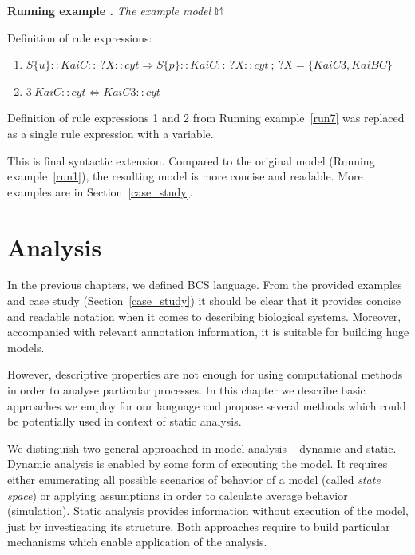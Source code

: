 \documentclass[12pt]{fithesis2}
\newcounter{counter}[section]
\renewcommand{\thecounter}{\thesection.\arabic{counter}}
\newenvironment{runningExample}[1]{\bigskip\refstepcounter{counter}\noindent\textbf{Running example \thecounter} \emph{#1} \par\nopagebreak}{\bigskip}
\begin{document}
\begin{runningExample}{The example model $\mathds{M}$}
\label{run8}
\noindent Definition of rule expressions:
{\small
\begin{enumerate}
\item \hspace*{-0.6cm} $S\{u\}::KaiC::~?X::cyt \Rightarrow S\{p\}::KaiC::~?X::cyt ~;~ ?X = \{KaiC3, KaiBC\}$

\item \hspace*{-0.6cm} $3~KaiC::cyt \Leftrightarrow KaiC3::cyt$
\end{enumerate}
}
\end{runningExample}

\noindent Definition of rule expressions 1 and 2 from Running example~\ref{run7} was replaced as a single rule expression with a variable.

This is final syntactic extension. Compared to the original model (Running example~\ref{run1}), the resulting model is more concise and readable. More examples are in Section~\ref{case_study}.

\chapter{Analysis}
\label{analysis}

In the previous chapters, we defined BCS language. From the provided examples and case study (Section~\ref{case_study}) it should be clear that it provides concise and readable notation when it comes to describing biological systems. Moreover, accompanied with relevant annotation information, it is suitable for building huge models.

However, descriptive properties are not enough for using computational methods in order to analyse particular processes. In this chapter we describe basic approaches we employ for our language and propose several methods which could be potentially used in context of static analysis.

We distinguish two general approached in model analysis -- dynamic and static. Dynamic analysis is enabled by some form of executing the model. It requires either enumerating all possible scenarios of behavior of a model (called \emph{state space}) or applying assumptions in order to calculate average behavior (simulation). Static analysis provides information without execution of the model, just by investigating its structure. Both approaches require to build particular mechanisms which enable application of the analysis.
\end{document}
